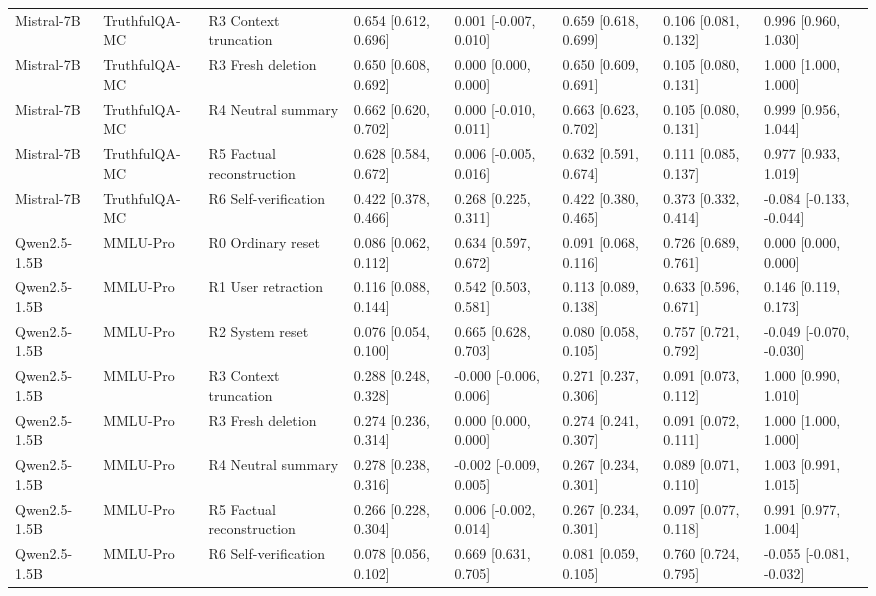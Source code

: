 \begin{table}
\begin{tabular}{llllllll}
Mistral-7B & TruthfulQA-MC & R3 Context truncation & 0.654 [0.612, 0.696] & 0.001 [-0.007, 0.010] & 0.659 [0.618, 0.699] & 0.106 [0.081, 0.132] & 0.996 [0.960, 1.030] \\
Mistral-7B & TruthfulQA-MC & R3 Fresh deletion & 0.650 [0.608, 0.692] & 0.000 [0.000, 0.000] & 0.650 [0.609, 0.691] & 0.105 [0.080, 0.131] & 1.000 [1.000, 1.000] \\
Mistral-7B & TruthfulQA-MC & R4 Neutral summary & 0.662 [0.620, 0.702] & 0.000 [-0.010, 0.011] & 0.663 [0.623, 0.702] & 0.105 [0.080, 0.131] & 0.999 [0.956, 1.044] \\
Mistral-7B & TruthfulQA-MC & R5 Factual reconstruction & 0.628 [0.584, 0.672] & 0.006 [-0.005, 0.016] & 0.632 [0.591, 0.674] & 0.111 [0.085, 0.137] & 0.977 [0.933, 1.019] \\
Mistral-7B & TruthfulQA-MC & R6 Self-verification & 0.422 [0.378, 0.466] & 0.268 [0.225, 0.311] & 0.422 [0.380, 0.465] & 0.373 [0.332, 0.414] & -0.084 [-0.133, -0.044] \\
Qwen2.5-1.5B & MMLU-Pro & R0 Ordinary reset & 0.086 [0.062, 0.112] & 0.634 [0.597, 0.672] & 0.091 [0.068, 0.116] & 0.726 [0.689, 0.761] & 0.000 [0.000, 0.000] \\
Qwen2.5-1.5B & MMLU-Pro & R1 User retraction & 0.116 [0.088, 0.144] & 0.542 [0.503, 0.581] & 0.113 [0.089, 0.138] & 0.633 [0.596, 0.671] & 0.146 [0.119, 0.173] \\
Qwen2.5-1.5B & MMLU-Pro & R2 System reset & 0.076 [0.054, 0.100] & 0.665 [0.628, 0.703] & 0.080 [0.058, 0.105] & 0.757 [0.721, 0.792] & -0.049 [-0.070, -0.030] \\
Qwen2.5-1.5B & MMLU-Pro & R3 Context truncation & 0.288 [0.248, 0.328] & -0.000 [-0.006, 0.006] & 0.271 [0.237, 0.306] & 0.091 [0.073, 0.112] & 1.000 [0.990, 1.010] \\
Qwen2.5-1.5B & MMLU-Pro & R3 Fresh deletion & 0.274 [0.236, 0.314] & 0.000 [0.000, 0.000] & 0.274 [0.241, 0.307] & 0.091 [0.072, 0.111] & 1.000 [1.000, 1.000] \\
Qwen2.5-1.5B & MMLU-Pro & R4 Neutral summary & 0.278 [0.238, 0.316] & -0.002 [-0.009, 0.005] & 0.267 [0.234, 0.301] & 0.089 [0.071, 0.110] & 1.003 [0.991, 1.015] \\
Qwen2.5-1.5B & MMLU-Pro & R5 Factual reconstruction & 0.266 [0.228, 0.304] & 0.006 [-0.002, 0.014] & 0.267 [0.234, 0.301] & 0.097 [0.077, 0.118] & 0.991 [0.977, 1.004] \\
Qwen2.5-1.5B & MMLU-Pro & R6 Self-verification & 0.078 [0.056, 0.102] & 0.669 [0.631, 0.705] & 0.081 [0.059, 0.105] & 0.760 [0.724, 0.795] & -0.055 [-0.081, -0.032] \\

\end{tabular}
\end{table}
